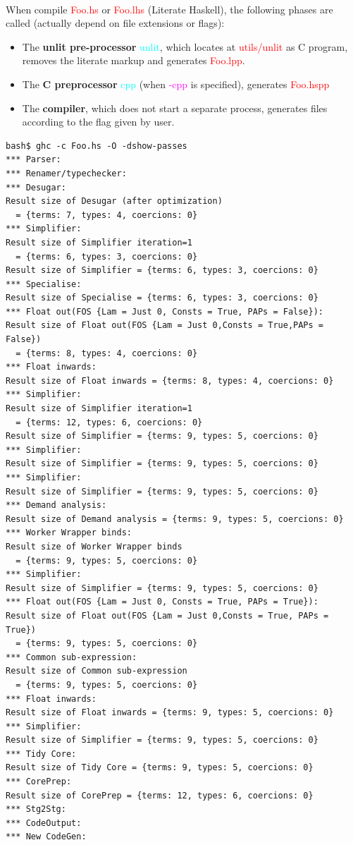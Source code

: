 \documentclass{article}
\begin{document}
	\paragraph{}
	When compile \textcolor{red}{Foo.hs} or \textcolor{red}{Foo.lhs} (Literate Haskell), the following phases are called (actually depend on file extensions or flags):
	\begin{itemize}
		\item The \textbf{unlit pre-processor} \textcolor{cyan}{unlit}, which locates at \textcolor{red}{utils/unlit} as C program, removes the literate markup and generates \textcolor{red}{Foo.lpp}.
		\item The \textbf{C preprocessor} \textcolor{cyan}{cpp} (when \textcolor{magenta}{-cpp} is specified), generates \textcolor{red}{Foo.hspp}
		\item The \textbf{compiler}, which does not start a separate process, generates files according to the flag given by user.
	\end{itemize}
	\begin{lstlisting}
bash$ ghc -c Foo.hs -O -dshow-passes
*** Parser:
*** Renamer/typechecker:
*** Desugar:
Result size of Desugar (after optimization)
  = {terms: 7, types: 4, coercions: 0}
*** Simplifier:
Result size of Simplifier iteration=1
  = {terms: 6, types: 3, coercions: 0}
Result size of Simplifier = {terms: 6, types: 3, coercions: 0}
*** Specialise:
Result size of Specialise = {terms: 6, types: 3, coercions: 0}
*** Float out(FOS {Lam = Just 0, Consts = True, PAPs = False}):
Result size of Float out(FOS {Lam = Just 0,Consts = True,PAPs = False})
  = {terms: 8, types: 4, coercions: 0}
*** Float inwards:
Result size of Float inwards = {terms: 8, types: 4, coercions: 0}
*** Simplifier:
Result size of Simplifier iteration=1
  = {terms: 12, types: 6, coercions: 0}
Result size of Simplifier = {terms: 9, types: 5, coercions: 0}
*** Simplifier:
Result size of Simplifier = {terms: 9, types: 5, coercions: 0}
*** Simplifier:
Result size of Simplifier = {terms: 9, types: 5, coercions: 0}
*** Demand analysis:
Result size of Demand analysis = {terms: 9, types: 5, coercions: 0}
*** Worker Wrapper binds:
Result size of Worker Wrapper binds
  = {terms: 9, types: 5, coercions: 0}
*** Simplifier:
Result size of Simplifier = {terms: 9, types: 5, coercions: 0}
*** Float out(FOS {Lam = Just 0, Consts = True, PAPs = True}):
Result size of Float out(FOS {Lam = Just 0,Consts = True, PAPs = True})
  = {terms: 9, types: 5, coercions: 0}
*** Common sub-expression:
Result size of Common sub-expression
  = {terms: 9, types: 5, coercions: 0}
*** Float inwards:
Result size of Float inwards = {terms: 9, types: 5, coercions: 0}
*** Simplifier:
Result size of Simplifier = {terms: 9, types: 5, coercions: 0}
*** Tidy Core:
Result size of Tidy Core = {terms: 9, types: 5, coercions: 0}
*** CorePrep:
Result size of CorePrep = {terms: 12, types: 6, coercions: 0}
*** Stg2Stg:
*** CodeOutput:
*** New CodeGen:
	\end{lstlisting}
\end{document}
